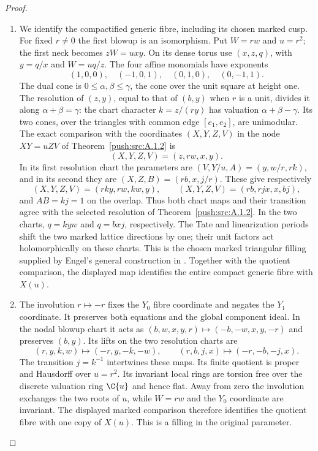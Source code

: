 \begin{proof}
\begin{enumerate}[label=\arabic*.,leftmargin=*]
\item We identify the compactified generic fibre, including its chosen marked cusp. For fixed $r\ne0$ the first blowup is an isomorphism. Put $W=rw$ and $u=r^2$; the first neck becomes $zW=u xy$. On its dense torus use $(x,z,q)$, with $y=q/x$ and $W=uq/z$. The four affine monomials have exponents
\[
 (1,0,0),\quad(-1,0,1),\quad(0,1,0),\quad(0,-1,1).
\]
The dual cone is $0\le\alpha,\beta\le\gamma$, the cone over the unit square at height one. The resolution of $(z,y)$, equal to that of $(b,y)$ when $r$ is a unit, divides it along $\alpha+\beta=\gamma$: the chart character $k=z/(ry)$ has valuation $\alpha+\beta-\gamma$. Its two cones, over the triangles with common edge $[e_1,e_2]$, are unimodular. The exact comparison with the coordinates $(X,Y,Z,V)$ in the node $XY=uZV$ of Theorem~\ref{push:src:A.1.2} is
\[
 (X,Y,Z,V)=(z,rw,x,y).
\]
In its first resolution chart the parameters are $(V,Y/u,A)=(y,w/r,rk)$, and in its second they are $(X,Z,B)=(rb,x,j/r)$. These give respectively
\[
 (X,Y,Z,V)=(rk y,rw,kw,y),\qquad
 (X,Y,Z,V)=(rb,rjx,x,bj),
\]
and $AB=kj=1$ on the overlap. Thus both chart maps and their transition agree with the selected resolution of Theorem~\ref{push:src:A.1.2}. In the two charts, $q=kyw$ and $q=bxj$, respectively. The Tate and linearization periods shift the two marked lattice directions by one; their unit factors act holomorphically on these charts. This is the chosen marked triangular filling supplied by Engel's general construction in \cite[Proposition~2.8, pp.~6--7]{Engel2026}. Together with the quotient comparison, the displayed map identifies the entire compact generic fibre with $X(u)$.

\item The involution $r\mapsto-r$ fixes the $Y_0$ fibre coordinate and negates the $Y_1$ coordinate. It preserves both equations and the global component ideal. In the nodal blowup chart it acts as $(b,w,x,y,r)\mapsto(-b,-w,x,y,-r)$ and preserves $(b,y)$. Its lifts on the two resolution charts are
\[
 (r,y,k,w)\longmapsto(-r,y,-k,-w),\qquad
 (r,b,j,x)\longmapsto(-r,-b,-j,x).
\]
The transition $j=k^{-1}$ intertwines these maps. Its finite quotient is proper and Hausdorff over $u=r^2$. Its invariant local rings are torsion free over the discrete valuation ring $\C\{u\}$ and hence flat. Away from zero the involution exchanges the two roots of $u$, while $W=rw$ and the $Y_0$ coordinate are invariant. The displayed marked comparison therefore identifies the quotient fibre with one copy of $X(u)$. This is a filling in the original parameter.
\end{enumerate}
\end{proof}

